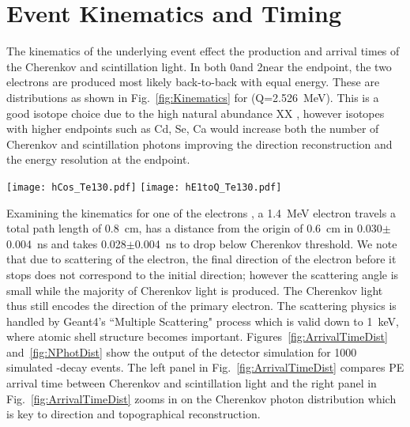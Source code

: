 \section{Event Kinematics and Timing}
\label{sec:event_timing}
The kinematics of the underlying event effect the production and arrival times of the Cherenkov and scintillation light. In both 0\nbb and 2\nbb near the endpoint, the two electrons are produced most likely back-to-back with equal energy. These are distributions as shown in Fig.~\ref{fig:Kinematics} for \Te(Q=2.526~MeV). This is a good isotope choice due to the high natural abundance XX , however isotopes with higher endpoints such as Cd, Se, Ca would increase both the number of Cherenkov and scintillation photons improving the direction reconstruction and the energy resolution at the endpoint.

\begin{figure*}[ht]
  \centering
  \texttt{[image: hCos\_Te130.pdf]}
  \texttt{[image: hE1toQ\_Te130.pdf]}
  \caption{Comparison between kinematics of 0{\nbb} (\emph{dashed red
      lines}) and 2{\nbb} decays (\emph{solid black lines}) for events
    with the total kinetic energy of the electrons above 90\% of the
    Q-value. \emph{Left:} Cosine of the angle between two
    electrons. \emph{Right:} Fraction of energy carried by one of the
    two electrons. Due to limited statistic around the energy spectrum
    end point for 2{\nbb} decay we show statistical errors for each
    bin.}
  \label{fig:Kinematics}
\end{figure*}


Examining the kinematics for one of the \bb electrons , a 1.4~MeV electron travels a total path length of 0.8~cm, has a distance from the origin of 0.6~cm in 0.030$\pm$0.004~ns  and takes 0.028$\pm$0.004~ns to drop below Cherenkov threshold. We note that due to scattering of the electron, the final direction of the electron before it stops does not correspond to the initial direction; however the scattering angle is small while the majority of Cherenkov light is produced. The Cherenkov light thus still encodes the direction of the primary electron. The scattering physics is handled by Geant4's ``Multiple Scattering" process which is valid down to 1~keV, where atomic shell structure becomes important\cite{geant4scatt}. Figures~\ref{fig:ArrivalTimeDist} and~\ref{fig:NPhotDist} show the output of the detector simulation for 1000 simulated \Te \vbb-decay events. The left panel in Fig.~\ref{fig:ArrivalTimeDist} compares PE arrival time between Cherenkov and scintillation light  and the right panel in Fig.~\ref{fig:ArrivalTimeDist} zooms in on the Cherenkov photon distribution which is key to direction and topographical reconstruction.

